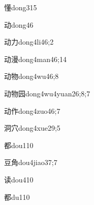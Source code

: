 \begin{verbete}{懂}{dong3}{15}
\end{verbete}

\begin{verbete}{动}{dong4}{6}
\end{verbete}

\begin{verbete}{动力}{dong4li4}{6;2}
\end{verbete}

\begin{verbete}{动漫}{dong4man4}{6;14}
\end{verbete}

\begin{verbete}{动物}{dong4wu4}{6;8}
\end{verbete}

\begin{verbete}{动物园}{dong4wu4yuan2}{6;8;7}
\end{verbete}

\begin{verbete}{动作}{dong4zuo4}{6;7}
\end{verbete}

\begin{verbete}{洞穴}{dong4xue2}{9;5}
\end{verbete}

\begin{verbete}{都}{dou1}{10}
\end{verbete}

\begin{verbete}{豆角}{dou4jiao3}{7;7}
\end{verbete}

\begin{verbete}{读}{dou4}{10}
\end{verbete}

\begin{verbete}{都}{du1}{10}
\end{verbete}

